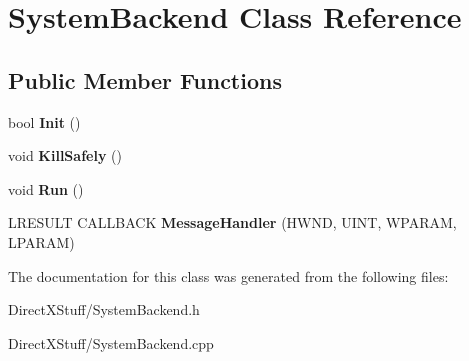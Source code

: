 \hypertarget{class_system_backend}{\section{System\-Backend Class Reference}
\label{class_system_backend}
}
\subsection*{Public Member Functions}
\begin{DoxyCompactItemize}
\item 
\hypertarget{class_system_backend_aa30b06f6bf29a25bd649625781254585}{bool {\bfseries Init} ()}\label{class_system_backend_aa30b06f6bf29a25bd649625781254585}

\item 
\hypertarget{class_system_backend_ae542aa35870a8bdea735a699ab18470a}{void {\bfseries Kill\-Safely} ()}\label{class_system_backend_ae542aa35870a8bdea735a699ab18470a}

\item 
\hypertarget{class_system_backend_a91427254df97a98b53b210beac348596}{void {\bfseries Run} ()}\label{class_system_backend_a91427254df97a98b53b210beac348596}

\item 
\hypertarget{class_system_backend_aecf755cf20ab948485ae0c3790313aa2}{L\-R\-E\-S\-U\-L\-T C\-A\-L\-L\-B\-A\-C\-K {\bfseries Message\-Handler} (H\-W\-N\-D, U\-I\-N\-T, W\-P\-A\-R\-A\-M, L\-P\-A\-R\-A\-M)}\label{class_system_backend_aecf755cf20ab948485ae0c3790313aa2}

\end{DoxyCompactItemize}


The documentation for this class was generated from the following files\-:\begin{DoxyCompactItemize}
\item 
Direct\-X\-Stuff/System\-Backend.\-h\item 
Direct\-X\-Stuff/System\-Backend.\-cpp\end{DoxyCompactItemize}
